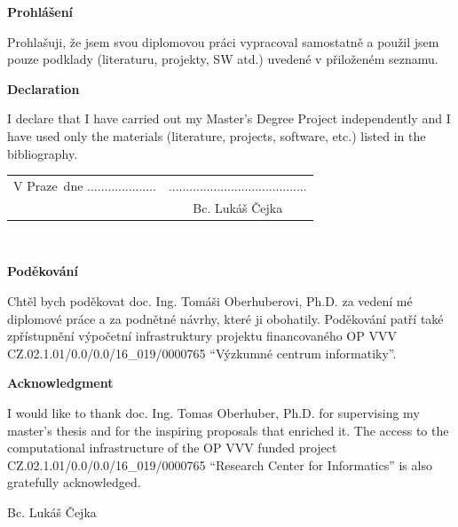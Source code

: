 \documentclass[a4paper, twoside, 12pt, czech, american]{book}
\newcommand{\paperAuthor}{Bc. Lukáš Čejka}   				 %
\newcommand{\place}{Praze} 									 %
\newcommand{\declarationCZ}{Prohlašuji, že jsem svou diplomovou práci vypracoval samostatně a použil jsem pouze podklady (literaturu, projekty, SW atd.) uvedené v přiloženém seznamu.}
\newcommand{\declarationEN}{I declare that I have carried out my Master's Degree Project independently and I have used only the materials (literature, projects, software, etc.) listed in the bibliography.}
\newcommand{\acknowledgementCZ}{Chtěl bych poděkovat doc. Ing. Tomáši Oberhuberovi, Ph.D. za vedení mé diplomové práce a za podnětné návrhy, které ji obohatily. Poděkování patří také zpřístupnění výpočetní infrastruktury projektu financovaného OP VVV CZ.02.1.01/0.0/0.0/16\_019/0000765 ``Výzkumné centrum informatiky''.}
\newcommand{\acknowledgementEN}{I would like to thank doc. Ing. Tomas Oberhuber, Ph.D. for supervising my master's thesis and for the inspiring proposals that enriched it. The access to the computational infrastructure of the OP VVV funded project CZ.02.1.01/0.0/0.0/16\_019/0000765 ``Research Center for Informatics'' is also gratefully acknowledged.}
\begin{document}
\textbf{Prohlášení}   %

\vspace{1em} 		  %
\declarationCZ

%
\vspace{1em}
\textbf{Declaration}

\vspace{1em}
\declarationEN
{}%

\vspace{2em}  									 							    	%
\hspace{-0.5em}\begin{tabularx}{\textwidth}{X c} 							    	%
	V \place\ dne .................... &........................................ \\ %
	& \paperAuthor
\end{tabularx}




\newpage
\thispagestyle{empty}

~
\vfill %

\textbf{Poděkování}

\vspace{1em} 				%
\acknowledgementCZ

%
\vspace{1em}
\textbf{Acknowledgment}

%
\vspace{1em} 				%
\acknowledgementEN
\begin{flushright}
	\paperAuthor
\end{flushright}  			%




\newpage   			  %
\thispagestyle{empty} %

\newbox\odstavecbox
\newlength\vyskaodstavce
\newcommand\odstavec[2]{%
	\setbox\odstavecbox=\hbox{%
		\parbox[t]{#1}{#2\vrule width 0pt depth 4pt}}%
	\global\vyskaodstavce=\dp\odstavecbox
	\box\odstavecbox}
\newcommand{\delka}{120mm} %
\end{document}
